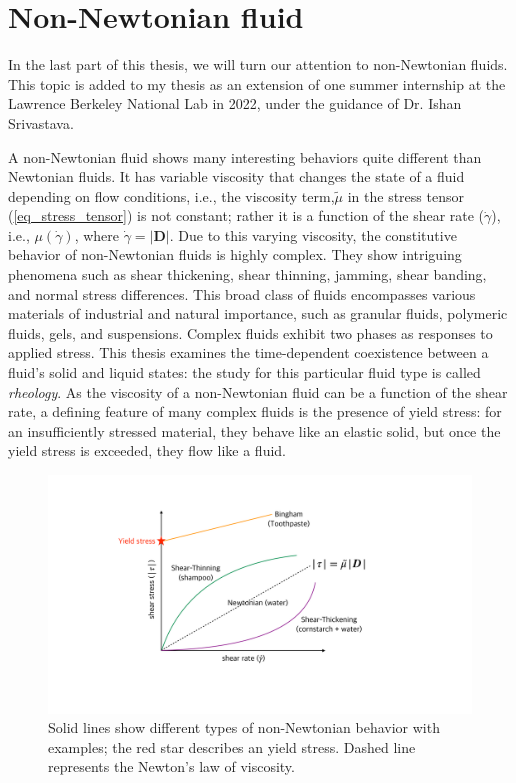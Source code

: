 \section{Non-Newtonian fluid}
In the last part of this thesis, we will turn our attention to non-Newtonian fluids. This topic is added to my thesis as an extension of one summer internship at the Lawrence Berkeley National Lab in 2022, under the guidance of Dr. Ishan Srivastava. 
\par
A non-Newtonian fluid shows many interesting behaviors quite different than Newtonian fluids. It has variable viscosity that changes the state of a fluid depending on flow conditions, i.e., the viscosity term,${\tilde{\mu}}$ in the stress tensor (\ref{eq_stress_tensor}) is not constant; rather it is a function of the shear rate ($\dot{\gamma}$), i.e., $\mu(\dot{\gamma})$, where
  $ \dot{\gamma} = \left| 
   {\boldsymbol{D}}
   \right|.
$
Due to this varying viscosity, the constitutive behavior of non-Newtonian fluids is highly complex. They show intriguing phenomena such as shear thickening, shear thinning, jamming, shear banding, and normal stress differences. This broad class of fluids encompasses various materials of industrial and natural importance, such as granular fluids, polymeric fluids, gels, and suspensions. Complex fluids exhibit two phases as responses to applied stress. This thesis examines the time-dependent coexistence between a fluid's solid and liquid states: the study for this particular fluid type is called {\textit{rheology}}. As the viscosity of a non-Newtonian fluid can be a function of the shear rate, a defining feature of many complex fluids is the presence of yield stress: for an insufficiently stressed material, they behave like an elastic solid, but once the yield stress is exceeded, they flow like a fluid. 
\begin{figure}[h]
	\begin{center}
		\includegraphics[scale=0.25]{figures/fig_yield_stress_graph.pdf}
	\end{center}
   \caption{Solid lines show different types of non-Newtonian behavior with examples; the red star describes an yield stress. Dashed line represents the Newton's law of viscosity.}
	\label{fig_rheology}
\end{figure}
